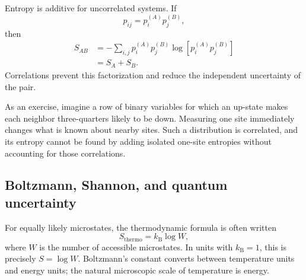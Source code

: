 Entropy is additive for uncorrelated systems. If
\begin{equation}
 p_{ij}=p_i^{(A)}p_j^{(B)},
\end{equation}
then
\begin{align}
 S_{AB}
 &=-\sum_{i,j}p_i^{(A)}p_j^{(B)}
 \log\!\left[p_i^{(A)}p_j^{(B)}\right]\\
 &=S_A+S_B.
 \label{eq:sm1-entropy-additivity}
\end{align}
Correlations prevent this factorization and reduce the independent
uncertainty of the pair.

As an exercise, imagine a row of binary variables for which an up-state makes
each neighbor three-quarters likely to be down. Measuring one site
immediately changes what is known about nearby sites. Such a distribution is
correlated, and its entropy cannot be found by adding isolated one-site
entropies without accounting for those correlations.

\subsection{Boltzmann, Shannon, and quantum uncertainty}

\begin{classroomqa}
\end{classroomqa}

For equally likely microstates, the thermodynamic formula is often written
\begin{equation}
 S_{\mathrm{thermo}}=k_{\mathrm B}\log W,
 \label{eq:sm1-boltzmann-formula}
\end{equation}
where \(W\) is the number of accessible microstates. In units with
\(k_{\mathrm B}=1\), this is precisely \(S=\log W\). Boltzmann's constant
converts between temperature units and energy units; the natural microscopic
scale of temperature is energy.

\begin{classroomqa}
\end{classroomqa}

